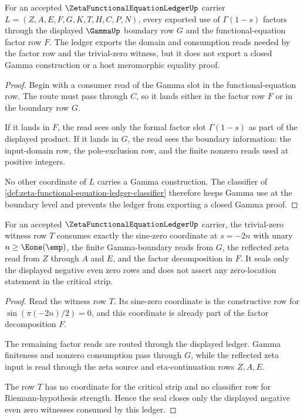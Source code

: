 \begin{theorem}
\label{thm:zeta-functional-equation-ledger-gamma-boundary}
For an accepted $\ZetaFunctionalEquationLedgerUp$ carrier $L=(Z,A,E,F,G,K,T,H,C,P,N)$, every exported use of $\Gamma(1-s)$ factors through the displayed $\GammaUp$ boundary row $G$ and the functional-equation factor row $F$. The ledger exports the domain and consumption reads needed by the factor row and the trivial-zero witness, but it does not export a closed Gamma construction or a host meromorphic equality proof.
\end{theorem}
\begin{proof}
Begin with a consumer read of the Gamma slot in the functional-equation row. The route must pass through $C$, so it lands either in the factor row $F$ or in the boundary row $G$.

If it lands in $F$, the read sees only the formal factor slot $\Gamma(1-s)$ as part of the displayed product. If it lands in $G$, the read sees the boundary information: the input-domain row, the pole-exclusion row, and the finite nonzero reads used at positive integers.

No other coordinate of $L$ carries a Gamma construction. The classifier of \autoref{def:zeta-functional-equation-ledger-classifier} therefore keeps Gamma use at the boundary level and prevents the ledger from exporting a closed Gamma proof.
\end{proof}

\begin{theorem}
\label{thm:zeta-functional-equation-ledger-trivial-zero-seal}
For an accepted $\ZetaFunctionalEquationLedgerUp$ carrier, the trivial-zero witness row $T$ consumes exactly the sine-zero coordinate at $s=-2n$ with unary $n\geq \Eone(\emp)$, the finite Gamma-boundary reads from $G$, the reflected zeta read from $Z$ through $A$ and $E$, and the factor decomposition in $F$. It seals only the displayed negative even zero rows and does not assert any zero-location statement in the critical strip.
\end{theorem}
\begin{proof}
Read the witness row $T$. Its sine-zero coordinate is the constructive row for $\sin(\pi(-2n)/2)=0$, and this coordinate is already part of the factor decomposition $F$.

The remaining factor reads are routed through the displayed ledger. Gamma finiteness and nonzero consumption pass through $G$, while the reflected zeta input is read through the zeta source and eta-continuation rows $Z,A,E$.

The row $T$ has no coordinate for the critical strip and no classifier row for Riemann-hypothesis strength. Hence the seal closes only the displayed negative even zero witnesses consumed by this ledger.
\end{proof}

